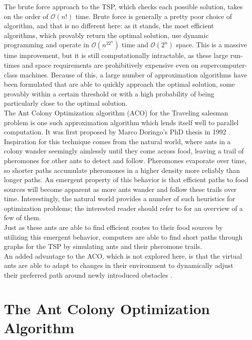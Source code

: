 \documentclass[twocolumn]{article}
\begin{document}
The brute force approach to the TSP, which checks each possible solution, takes 
on the order of $\mathcal{O}(n!)$ time. Brute force is generally a pretty poor choice of
algorithm, and that is no different here: as it stands, the most efficient 
algorithms, which provably return the optimal solution, use dynamic
programming and operate in $\mathcal{O}(n^22^n)$ time and $\mathcal{O}(2^n)$ space. 
This is a massive time improvement, but it is still computationally intractable, as 
these large run-times and space requirements are prohibitively expensive even on 
supercomputer-class machines. Because of this, a large number of approximation 
algorithms have been formulated that are able to quickly approach the optimal 
solution, some provably within a certain threshold or with a high probability of
being particularly close to the optimal solution.  \\

The Ant Colony Optimization algorithm (ACO) for the Traveling salesman problem 
is one such approximation algorithm which lends itself well to parallel 
computation. It was first proposed by Marco Doringo's PhD thesis in 1992 \cite{dorigo}. 
Inspiration for this technique comes from the natural world, where ants in a
colony wander seemingly aimlessly until they come across food, leaving
a trail of pheromones for other ants to detect and follow. Pheromones
evaporate over time, so shorter paths accumulate pheromones in a higher density 
more reliably than longer paths. An emergent property of this behavior is that 
efficient paths to food sources will become apparent as more ants wander and 
follow these trails over time. Interestingly, the natural world provides a number
of such heuristics for optimization problems; the interested reader should 
refer to \cite{nature} for an overview of a few of them. \\

Just as these ants are able to find efficient routes to their food sources by
utilizing this emergent behavior, computers are able to find short paths through
graphs for the TSP by simulating ants and their pheromone trails. \\

An added advantage to the ACO, which is not explored here, is that
the virtual ants are able to adapt to changes in their environment to 
dynamically adjust their preferred path around newly introduced obstacles 
\cite{iridia:aco}.

\section{The Ant Colony Optimization Algorithm} \label{sec:aco}
\end{document}
